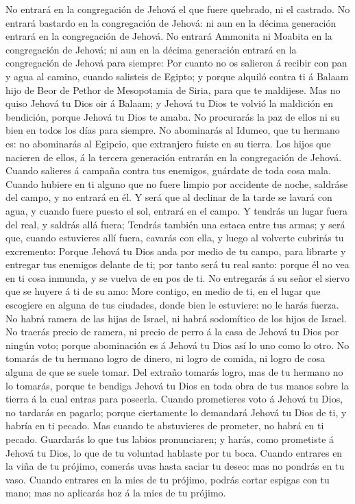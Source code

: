  No entrará en la congregación de Jehová el que fuere
quebrado, ni el castrado.  No entrará bastardo en la
congregación de Jehová: ni aun en la décima generación entrará en la
congregación de Jehová.  No entrará Ammonita ni Moabita en
la congregación de Jehová; ni aun en la décima generación entrará en la
congregación de Jehová para siempre:  Por cuanto no os
salieron á recibir con pan y agua al camino, cuando salisteis de Egipto;
y porque alquiló contra ti á Balaam hijo de Beor de Pethor de
Mesopotamia de Siria, para que te maldijese.  Mas no quiso
Jehová tu Dios oir á Balaam; y Jehová tu Dios te volvió la maldición en
bendición, porque Jehová tu Dios te amaba.  No procurarás
la paz de ellos ni su bien en todos los días para siempre.
 No abominarás al Idumeo, que tu hermano es: no abominarás
al Egipcio, que extranjero fuiste en su tierra.  Los hijos
que nacieren de ellos, á la tercera generación entrarán en la
congregación de Jehová.  Cuando salieres á campaña contra
tus enemigos, guárdate de toda cosa mala.  Cuando hubiere
en ti alguno que no fuere limpio por accidente de noche, saldráse del
campo, y no entrará en él.  Y será que al declinar de la
tarde se lavará con agua, y cuando fuere puesto el sol, entrará en el
campo.  Y tendrás un lugar fuera del real, y saldrás allá
fuera;  Tendrás también una estaca entre tus armas; y
será que, cuando estuvieres allí fuera, cavarás con ella, y luego al
volverte cubrirás tu excremento:  Porque Jehová tu Dios
anda por medio de tu campo, para librarte y entregar tus enemigos
delante de ti; por tanto será tu real santo: porque él no vea en ti cosa
inmunda, y se vuelva de en pos de ti.  No entregarás á su
señor el siervo que se huyere á ti de su amo:  More
contigo, en medio de ti, en el lugar que escogiere en alguna de tus
ciudades, donde bien le estuviere: no le harás fuerza. 
No habrá ramera de las hijas de Israel, ni habrá sodomítico de los hijos
de Israel.  No traerás precio de ramera, ni precio de
perro á la casa de Jehová tu Dios por ningún voto; porque abominación es
á Jehová tu Dios así lo uno como lo otro.  No tomarás de
tu hermano logro de dinero, ni logro de comida, ni logro de cosa alguna
de que se suele tomar.  Del extraño tomarás logro, mas de
tu hermano no lo tomarás, porque te bendiga Jehová tu Dios en toda obra
de tus manos sobre la tierra á la cual entras para poseerla.
 Cuando prometieres voto á Jehová tu Dios, no tardarás en
pagarlo; porque ciertamente lo demandará Jehová tu Dios de ti, y habría
en ti pecado.  Mas cuando te abstuvieres de prometer, no
habrá en ti pecado.  Guardarás lo que tus labios
pronunciaren; y harás, como prometiste á Jehová tu Dios, lo que de tu
voluntad hablaste por tu boca.  Cuando entrares en la
viña de tu prójimo, comerás uvas hasta saciar tu deseo: mas no pondrás
en tu vaso.  Cuando entrares en la mies de tu prójimo,
podrás cortar espigas con tu mano; mas no aplicarás hoz á la mies de tu
prójimo.

